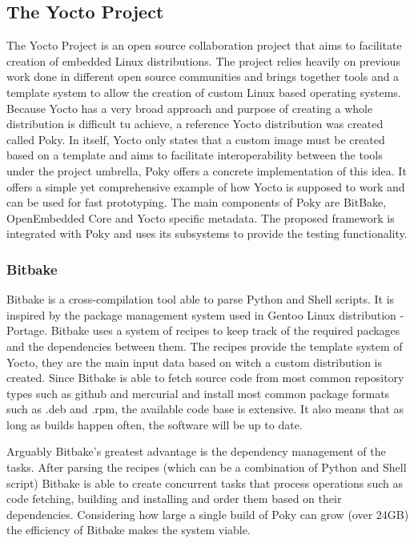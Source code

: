 \subsection{The Yocto Project}
The Yocto Project is an open source collaboration project that aims to facilitate creation of embedded Linux distributions. The project relies heavily on previous work done in different open source communities and brings together tools and a template system to allow the creation of custom Linux based operating systems. Because Yocto has a very broad approach and purpose of creating a whole distribution is difficult tu achieve, a reference Yocto distribution was created called Poky. In itself, Yocto only states that a custom image must be created based on a template and aims to facilitate interoperability between the tools under the project umbrella, Poky offers a concrete implementation of this idea. It offers a simple yet comprehensive example of how Yocto is supposed to work and can be used for fast prototyping. The main components of Poky are BitBake, OpenEmbedded Core and Yocto specific metadata. The proposed framework is integrated with Poky and uses its subsystems to provide the testing functionality.

\subsubsection*{Bitbake}
Bitbake is a cross-compilation tool able to parse Python and Shell scripts. It is inspired by the package management system used in Gentoo Linux distribution - Portage. Bitbake uses a system of recipes to keep track of the required packages and the dependencies between them. The recipes provide the template system of Yocto, they are the main input data based on witch a custom distribution is created. Since Bitbake is able to fetch source code from most common repository types such as github and mercurial and install most common package formats such as .deb and .rpm, the available code base is extensive. It also means that as long as builds happen often, the software will be up to date.

Arguably Bitbake's greatest advantage is the dependency management of the tasks. After parsing the recipes (which can be a combination of Python and Shell script) Bitbake is able to create concurrent tasks that process operations such as code fetching, building and installing and order them based on their dependencies. Considering how large a single build of Poky can grow (over 24GB) the efficiency of Bitbake makes the system viable.

